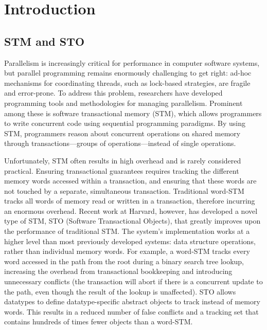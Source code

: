 \chapter{Introduction}
\section{STM and STO}
Parallelism is increasingly critical for performance in computer software systems, but parallel programming remains enormously challenging to get right: ad-hoc mechanisms for coordinating threads, such as lock-based strategies, are fragile and error-prone. To address this problem, researchers have developed programming tools and methodologies for managing parallelism. Prominent among these is software transactional memory (STM), which allows programmers to write concurrent code using sequential programming paradigms. By using STM, programmers reason about concurrent operations on shared memory through transactions---groups of operations---instead of single operations. 

Unfortunately, STM often results in high overhead and is rarely considered practical. Ensuring transactional guarantees requires tracking the different memory words accessed within a transaction, and ensuring that these words are not touched by a separate, simultaneous transaction. Traditional word-STM tracks all words of memory read or written in a transaction, therefore incurring an enormous overhead\cite{cascaval}. Recent work at Harvard, however, has developed a novel type of STM, STO (Software Transactional Objects)\cite{sto}, that greatly improves upon the performance of traditional STM. The system's implementation works at a higher level than most previously developed systems: data structure operations, rather than individual memory words. For example, a word-STM tracks every word accessed in the path from the root during a binary search tree lookup, increasing the overhead from transactional bookkeeping and introducing unnecessary conflicts (the transaction will abort if there is a concurrent update to the path, even though the result of the lookup is unaffected). STO allows datatypes to define datatype-specific abstract objects to track instead of memory words. This results in a reduced number of false conflicts and a tracking set that contains hundreds of times fewer objects than a word-STM. 

